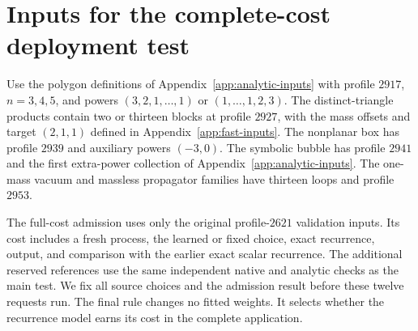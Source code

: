 \section{Inputs for the complete-cost deployment test}
\label{app:fast-deployment}
Use the polygon definitions of Appendix~\ref{app:analytic-inputs} with profile $2917$, $n=3,4,5$, and powers $(3,2,1,\ldots,1)$ or $(1,\ldots,1,2,3)$. The distinct-triangle products contain two or thirteen blocks at profile $2927$, with the mass offsets and target $(2,1,1)$ defined in Appendix~\ref{app:fast-inputs}. The nonplanar box has profile $2939$ and auxiliary powers $(-3,0)$. The symbolic bubble has profile $2941$ and the first extra-power collection of Appendix~\ref{app:analytic-inputs}. The one-mass vacuum and massless propagator families have thirteen loops and profile $2953$.

The full-cost admission uses only the original profile-$2621$ validation inputs. Its cost includes a fresh process, the learned or fixed choice, exact recurrence, output, and comparison with the earlier exact scalar recurrence. The additional reserved references use the same independent native and analytic checks as the main test. We fix all source choices and the admission result before these twelve requests run. The final rule changes no fitted weights. It selects whether the recurrence model earns its cost in the complete application.
